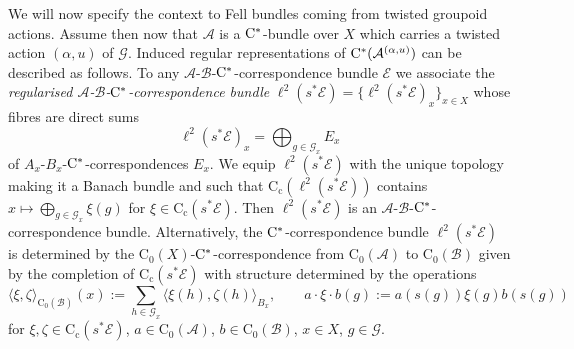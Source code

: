\documentclass[11 pt, leqno]{amsart}
\numberwithin{equation}{section}
\theoremstyle{plain}
\theoremstyle{definition}
\newcommand*{\contc}{\mathrm{C_c}}%
\newcommand*{\contz}{\mathrm{C_0}}%
\newcommand{\B}{\mathcal B}
\newcommand{\G}{\mathcal G} %
\newcommand{\EE}{\mathcal E}
\newcommand{\A}{\mathcal A}
\newcommand{\cst}{\ifmmode\mathrm{C}^*\else{$\mathrm{C}^*$}\fi}
\begin{document}
We will now specify the context to Fell bundles coming from twisted groupoid actions. 
Assume then now that $\A$ is a $\cst$-bundle over $X$ which carries a twisted action $(\alpha,u)$ of $\G$.
Induced regular representations of $\cst(\A^{(\alpha,u)})$ can be described as follows. 
To any $\A$-$\B$-$\cst$-correspondence bundle $\EE$ we associate the \emph{regularised $\A$-$\B$-$\cst$-correspondence bundle} $\ell^2(s^*\EE) = \{ \ell^2(s^*\EE)_x \}_{x\in X}$ whose fibres are direct sums
\[
    \ell^2(s^*\EE)_x = \bigoplus_{g \in \G_x} E_x
\]
of $A_x$-$B_x$-$\cst$-correspondences $E_x$. 
We equip $\ell^2(s^*\EE)$ with the unique topology making it a Banach bundle and such that $\contc(\ell^2(s^*\EE))$ contains $x\mapsto \bigoplus_{g \in \G_x} \xi(g)$ for $\xi\in \contc(s^*\EE)$. 
Then $\ell^2(s^*\EE)$ is an $\A$-$\B$-$\cst$-correspondence bundle. 
Alternatively, the $\cst$-correspondence bundle $\ell^2(s^*\EE)$ is determined by the $\contz(X)$-$\cst$-correspondence from $\contz(\A)$ to $\contz(\B)$ given by the completion of $\contc(s^*\EE)$ with structure determined by the operations 
\[
    \langle\xi, \zeta\rangle_{\contz(\B)}(x) := \sum_{h\in \G_x}\langle \xi(h),\zeta(h)\rangle_{B_x}, \qquad 
    a\cdot \xi\cdot b(g) := a(s(g))\xi(g) b(s(g))
\]
for $\xi, \zeta \in \contc(s^*\EE)$, $a\in\contz(\A)$, $b\in\contz(\B)$, $x\in X$, $g \in \G$.
\end{document}
